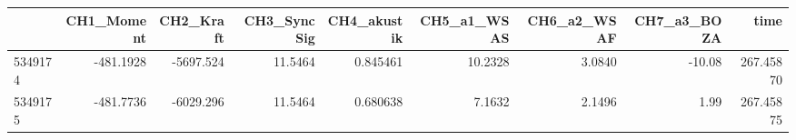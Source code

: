 \begin{tabular}{lrrrrrrrr}
\toprule
{} &  CH1\_Moment &  CH2\_Kraft &  CH3\_SyncSig &  CH4\_akustik &  CH5\_a1\_WSAS &  CH6\_a2\_WSAF &  CH7\_a3\_BOZA &       time \\
\midrule
5349174 &   -481.1928 &  -5697.524 &      11.5464 &     0.845461 &      10.2328 &       3.0840 &       -10.08 &  267.45870 \\
5349175 &   -481.7736 &  -6029.296 &      11.5464 &     0.680638 &       7.1632 &       2.1496 &         1.99 &  267.45875 \\
\bottomrule
\end{tabular}
